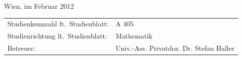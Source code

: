 \begin{titlepage}
\noindent\textsf{Wien, im Februar 2012}  %
\vfill

\noindent\begin{tabular}{@{}ll}
\textsf{Studienkennzahl lt.\ Studienblatt:}
&
\textsf{A 405}%
\\
\textsf{Studienrichtung lt.\ Studienblatt:}
&
\textsf{Mathematik}  %
\\
\textsf{Betreuer:}
&
\textsf{Univ.-Ass. Privatdoz. Dr. Stefan Haller}%
\end{tabular}

\end{titlepage}
